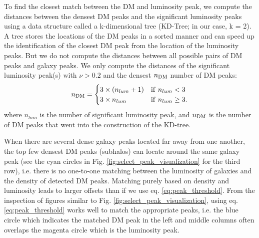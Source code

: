 To find the closest match between the DM and luminosity peak, 
we compute the distances between the densest DM peaks
and the significant luminosity peaks using a data structure called 
a k-dimensional tree (KD-Tree; in
our case, k = 2). A tree stores the locations of the DM peaks in a sorted
manner and can speed up the identification of the closest DM peak from the
location of the luminosity peaks.
But we do not compute the distances
between all possible pairs of DM peaks and galaxy peaks.  
We only compute the distances of the significant luminosity peak(s) with $\nu >
0.2$  and 
the densest $n_{\rm DM}$ number of DM peaks:
\begin{equation}
	n_{\rm DM} = \begin{cases}		
		3 \times (n_{lum} + 1) & {\rm if~} n_{lum} < 3 \\
	3 \times n_{lum}  & {\rm if~} n_{lum} \geq 3.
	\end{cases}
	\label{eq:peak_threshold}
\end{equation}
where $n_{lum}$ is the number of significant luminosity peak, and $n_{\rm DM}$
is the number of DM peaks that went into the construction of the KD-tree.

When there are several dense galaxy peaks located far away from one another, 
the top few densest DM peaks (subhalos) can locate around the same galaxy
peak (see the cyan circles in Fig. \ref{fig:select_peak_visualization} for the
third row), i.e. there is no one-to-one matching between the luminosity of 
galaxies and the density of detected DM peaks. 
Matching purely based on density and luminosity leads to larger offsets than if
we use eq. \ref{eq:peak_threshold}.
From the inspection of figures similar to 
Fig. \ref{fig:select_peak_visualization}, 
using eq. \ref{eq:peak_threshold} works well to match the 
appropriate peaks, i.e. the blue circle which indicates the matched DM peak 
in the left and middle columns 
often overlaps the magenta circle which is the luminosity peak.  

